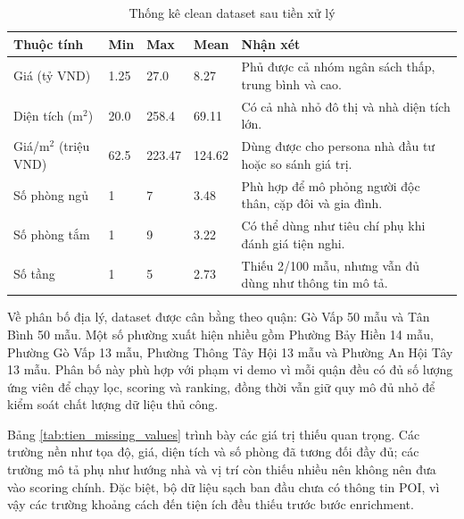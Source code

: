 \documentclass[a4paper,12pt]{article}
\begin{document}
\begin{table}[H]
\centering
\caption{Thống kê clean dataset sau tiền xử lý}
\label{tab:tien_clean_stats}
\small
\begin{tabularx}{\textwidth}{|P{4.2cm}|P{2.2cm}|P{2.2cm}|P{2.2cm}|Y|}
\hline
\textbf{Thuộc tính} & \textbf{Min} & \textbf{Max} & \textbf{Mean} & \textbf{Nhận xét} \\ \hline
Giá (tỷ VND) & 1.25 & 27.0 & 8.27 & Phủ được cả nhóm ngân sách thấp, trung bình và cao. \\ \hline
Diện tích (m$^2$) & 20.0 & 258.4 & 69.11 & Có cả nhà nhỏ đô thị và nhà diện tích lớn. \\ \hline
Giá/m$^2$ (triệu VND) & 62.5 & 223.47 & 124.62 & Dùng được cho persona nhà đầu tư hoặc so sánh giá trị. \\ \hline
Số phòng ngủ & 1 & 7 & 3.48 & Phù hợp để mô phỏng người độc thân, cặp đôi và gia đình. \\ \hline
Số phòng tắm & 1 & 9 & 3.22 & Có thể dùng như tiêu chí phụ khi đánh giá tiện nghi. \\ \hline
Số tầng & 1 & 5 & 2.73 & Thiếu 2/100 mẫu, nhưng vẫn đủ dùng như thông tin mô tả. \\ \hline
\end{tabularx}
\end{table}

Về phân bố địa lý, dataset được cân bằng theo quận: Gò Vấp 50 mẫu và Tân Bình 50 mẫu. Một số phường xuất hiện nhiều gồm Phường Bảy Hiền 14 mẫu, Phường Gò Vấp 13 mẫu, Phường Thông Tây Hội 13 mẫu và Phường An Hội Tây 13 mẫu. Phân bố này phù hợp với phạm vi demo vì mỗi quận đều có đủ số lượng ứng viên để chạy lọc, scoring và ranking, đồng thời vẫn giữ quy mô đủ nhỏ để kiểm soát chất lượng dữ liệu thủ công.

Bảng \ref{tab:tien_missing_values} trình bày các giá trị thiếu quan trọng. Các trường nền như tọa độ, giá, diện tích và số phòng đã tương đối đầy đủ; các trường mô tả phụ như hướng nhà và vị trí còn thiếu nhiều nên không nên đưa vào scoring chính. Đặc biệt, bộ dữ liệu sạch ban đầu chưa có thông tin POI, vì vậy các trường khoảng cách đến tiện ích đều thiếu trước bước enrichment.
\end{document}
